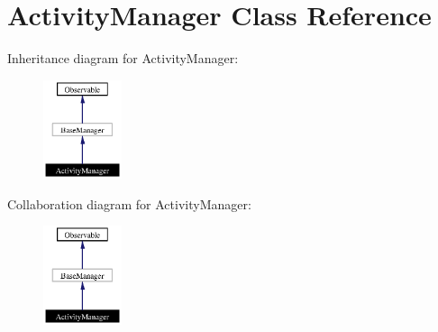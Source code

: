 \section{Activity\-Manager Class Reference}
\label{classActivityManager}
Inheritance diagram for Activity\-Manager:\begin{figure}[H]
\begin{center}
\leavevmode
\includegraphics[width=65pt]{classActivityManager__inherit__graph}
\end{center}
\end{figure}
Collaboration diagram for Activity\-Manager:\begin{figure}[H]
\begin{center}
\leavevmode
\includegraphics[width=65pt]{classActivityManager__coll__graph}
\end{center}
\end{figure}
